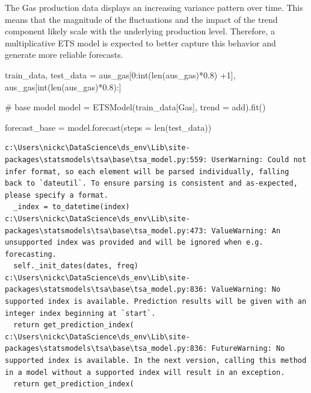\documentclass[
  11pt,
]{article}
\newenvironment{Shaded}{\begin{snugshade}}{\end{snugshade}}
\newcommand{\BuiltInTok}[1]{\textcolor[rgb]{0.00,0.23,0.31}{#1}}
\newcommand{\CommentTok}[1]{\textcolor[rgb]{0.37,0.37,0.37}{#1}}
\newcommand{\DecValTok}[1]{\textcolor[rgb]{0.68,0.00,0.00}{#1}}
\newcommand{\FloatTok}[1]{\textcolor[rgb]{0.68,0.00,0.00}{#1}}
\newcommand{\NormalTok}[1]{\textcolor[rgb]{0.00,0.23,0.31}{#1}}
\newcommand{\OperatorTok}[1]{\textcolor[rgb]{0.37,0.37,0.37}{#1}}
\newcommand{\StringTok}[1]{\textcolor[rgb]{0.13,0.47,0.30}{#1}}
\begin{document}
The Gas production data displays an increasing variance pattern over
time. This means that the magnitude of the fluctuations and the impact
of the trend component likely scale with the underlying production
level. Therefore, a multiplicative ETS model is expected to better
capture this behavior and generate more reliable forecasts.

\begin{Shaded}
\begin{Highlighting}[]
\NormalTok{train\_data, test\_data }\OperatorTok{=}\NormalTok{ aus\_gas[}\DecValTok{0}\NormalTok{:}\BuiltInTok{int}\NormalTok{(}\BuiltInTok{len}\NormalTok{(aus\_gas)}\OperatorTok{*}\FloatTok{0.8}\NormalTok{) }\OperatorTok{+}\DecValTok{1}\NormalTok{], aus\_gas[}\BuiltInTok{int}\NormalTok{(}\BuiltInTok{len}\NormalTok{(aus\_gas)}\OperatorTok{*}\FloatTok{0.8}\NormalTok{):]}
\end{Highlighting}
\end{Shaded}

\begin{Shaded}
\begin{Highlighting}[]
\CommentTok{\# base model}
\NormalTok{model }\OperatorTok{=}\NormalTok{ ETSModel(train\_data[}\StringTok{\textquotesingle{}Gas\textquotesingle{}}\NormalTok{], trend }\OperatorTok{=} \StringTok{\textquotesingle{}add\textquotesingle{}}\NormalTok{).fit()}

\NormalTok{forecast\_base }\OperatorTok{=}\NormalTok{ model.forecast(steps }\OperatorTok{=} \BuiltInTok{len}\NormalTok{(test\_data))}
\end{Highlighting}
\end{Shaded}

\begin{verbatim}
c:\Users\nickc\DataScience\ds_env\Lib\site-packages\statsmodels\tsa\base\tsa_model.py:559: UserWarning: Could not infer format, so each element will be parsed individually, falling back to `dateutil`. To ensure parsing is consistent and as-expected, please specify a format.
  _index = to_datetime(index)
c:\Users\nickc\DataScience\ds_env\Lib\site-packages\statsmodels\tsa\base\tsa_model.py:473: ValueWarning: An unsupported index was provided and will be ignored when e.g. forecasting.
  self._init_dates(dates, freq)
c:\Users\nickc\DataScience\ds_env\Lib\site-packages\statsmodels\tsa\base\tsa_model.py:836: ValueWarning: No supported index is available. Prediction results will be given with an integer index beginning at `start`.
  return get_prediction_index(
c:\Users\nickc\DataScience\ds_env\Lib\site-packages\statsmodels\tsa\base\tsa_model.py:836: FutureWarning: No supported index is available. In the next version, calling this method in a model without a supported index will result in an exception.
  return get_prediction_index(
\end{verbatim}
\end{document}
